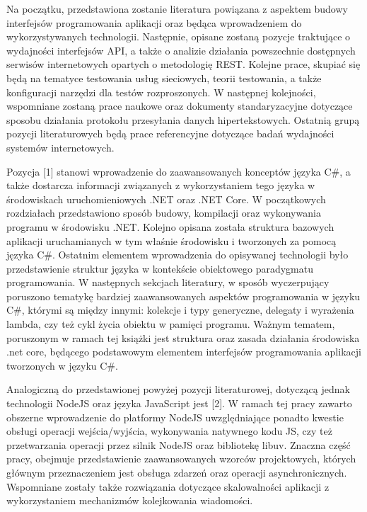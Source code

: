 Na początku, przedstawiona zostanie literatura powiązana z aspektem budowy interfejsów programowania aplikacji oraz będąca wprowadzeniem do wykorzystywanych technologii. Następnie, opisane zostaną pozycje traktujące o wydajności interfejsów API, a także o analizie działania powszechnie dostępnych serwisów internetowych opartych o metodologię REST. Kolejne prace, skupiać się będą na tematyce testowania usług sieciowych, teorii testowania, a także konfiguracji narzędzi dla testów rozproszonych. W następnej kolejności, wspomniane zostaną prace naukowe oraz dokumenty standaryzacyjne dotyczące sposobu działania protokołu przesyłania danych hipertekstowych. Ostatnią grupą pozycji literaturowych będą prace referencyjne dotyczące badań wydajności systemów internetowych.

Pozycja [1] stanowi wprowadzenie do zaawansowanych konceptów języka C\#, a także dostarcza informacji związanych z wykorzystaniem tego języka w środowiskach uruchomieniowych .NET oraz .NET Core. W początkowych rozdziałach przedstawiono sposób budowy, kompilacji oraz wykonywania programu w środowisku .NET. Kolejno opisana została struktura bazowych aplikacji uruchamianych w tym właśnie środowisku i tworzonych za pomocą języka C\#. Ostatnim elementem wprowadzenia do opisywanej technologii było przedstawienie struktur języka w kontekście obiektowego paradygmatu programowania.    W następnych sekcjach literatury, w sposób wyczerpujący poruszono tematykę bardziej zaawansowanych aspektów programowania w języku C\#, którymi są między innymi: kolekcje i typy generyczne, delegaty i wyrażenia lambda, czy też cykl życia obiektu w pamięci programu. Ważnym tematem, poruszonym w ramach tej książki jest struktura oraz zasada działania środowiska .net core, będącego podstawowym elementem interfejsów programowania aplikacji tworzonych w języku C\#.

Analogiczną do przedstawionej powyżej pozycji literaturowej, dotyczącą jednak technologii NodeJS oraz języka JavaScript jest [2]. W ramach tej pracy zawarto obszerne wprowadzenie do platformy NodeJS uwzględniające ponadto kwestie obsługi operacji wejścia/wyjścia, wykonywania natywnego kodu JS, czy też przetwarzania operacji przez silnik NodeJS oraz bibliotekę libuv. Znaczna część pracy, obejmuje przedstawienie zaawansowanych wzorców projektowych, których głównym przeznaczeniem jest obsługa zdarzeń oraz operacji asynchronicznych. Wspomniane zostały także rozwiązania dotyczące skalowalności aplikacji z wykorzystaniem mechanizmów kolejkowania wiadomości.

